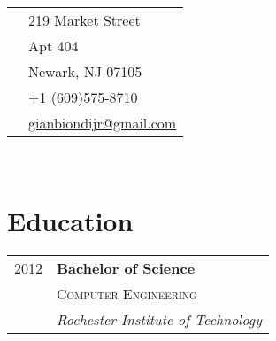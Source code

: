 \documentclass[10pt]{article} %
\begin{document}
{\begin{minipage}[t]{0.5\textwidth}

\end{minipage} %
\hfill
\begin{minipage}[t]{0.44\textwidth} %
\vspace{0pt} %


\colorbox{shade}{\textcolor{text1}{
  \begin{tabular}{c|p{7cm}}
    \raisebox{-4pt}{\textifsymbol{18}} 
      & 219 Market Street \\
      & Apt 404 \\
      & Newark, NJ 07105 \\ %
    \raisebox{-3pt}{\Mobilefone} 
      & +1 (609)575-8710 \\ %
    \raisebox{-1pt}{\Letter} 
      & \href{mailto:gianbiondijr@gmail.com}{gianbiondijr@gmail.com} \\ %
  \end{tabular}
}}\\[10pt]


\section{Education} 

\begin{tabular}{rl} %


2012 & \textbf{Bachelor of Science} \\ 
& \textsc{Computer Engineering} \\ 
& \textit{Rochester Institute of Technology}\\


\end{tabular}
\end{minipage}}
\end{document}
